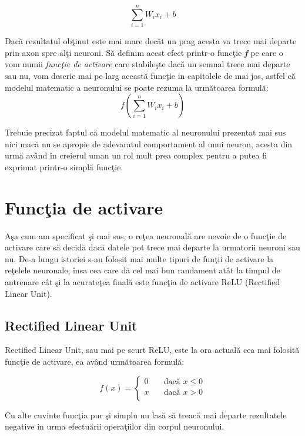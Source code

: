 $$ \sum_{i=1}^{n} W_i x_i + b $$

Dac\u{a} rezultatul ob\c{t}inut este mai mare dec\^{a}t un prag acesta va trece mai departe prin axon spre al\c{t}i neuroni. S\u{a} definim acest efect printr-o func\c{t}ie \textbf{\textit{f}} pe care o vom numii \textit{func\c{t}ie de activare} care stabile\c{s}te dac\u{a} un semnal trece mai departe sau nu, vom descrie mai pe larg aceast\u{a} func\c{t}ie in capitolele de mai jos, astfel c\u{a} modelul matematic a neuronului se poate rezuma la urm\u{a}toarea formul\u{a}:
$$f( \sum_{i=1}^{n} W_i x_i + b ) $$

\par

Trebuie precizat faptul c\u{a} modelul matematic al neuronului prezentat mai sus nici mac\u{a} nu se apropie de adevaratul comportament al unui neuron, acesta din urm\u{a} av\^{a}nd \^{i}n creierul uman un rol mult prea complex pentru a putea fi exprimat printr-o simpl\u{a} func\c{t}ie. 


\section{Func\c{t}ia de activare}

A\c{s}a cum am specificat \c{s}i mai sus, o re\c{t}ea neuronal\u{a} are nevoie de o func\c{t}ie de activare care s\u{a} decid\u{a} dac\u{a} datele pot trece mai departe la urmatorii neuroni sau nu. De-a lungu istoriei s-au folosit mai multe tipuri de fun\c{t}ii de activare la re\c{t}elele neuronale, \^{i}nsa cea care d\u{a} cel mai bun randament at\^{a}t la timpul de antrenare c\^{a}t \c{s}i la acurate\c{t}ea final\u{a} este func\c{t}ia de activare ReLU (Rectified Linear Unit).

\subsection{Rectified Linear Unit}

Rectified Linear Unit, sau mai pe scurt ReLU, este la ora actual\u{a} cea mai folosit\u{a} func\c{t}ie de activare, ea av\^{a}nd urm\u{a}toarea formul\u{a}:

\[ f(x) =
  \begin{cases}
    0       & \quad \text{dac\u{a} } x \leq 0\\
    x  & \quad \text{dac\u{a} } x > 0\\
  \end{cases}
\]

Cu alte cuvinte func\c{t}ia pur \c{s}i simplu nu las\u{a} s\u{a} treac\u{a} mai departe rezultatele negative in urma efectu\u{a}rii opera\c{t}iilor din corpul neuronului.

